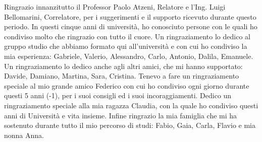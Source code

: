 Ringrazio innanzitutto il Professor Paolo Atzeni, Relatore e l'Ing. Luigi Bellomarini, Correlatore, per i suggerimenti e il supporto ricevuto durante questo periodo. \newline \newline
In questi cinque anni di università, ho conosciuto persone con le quali ho condiviso molto che ringrazio con tutto il cuore. \newline \newline
Un ringraziamento lo dedico al gruppo studio che abbiamo formato qui all'università e con cui ho condiviso la mia esperienza: Gabriele, Valerio, Alessandro, Carlo, Antonio, Dalila, Emanuele. \newline \newline
Un ringraziamento lo dedico anche agli altri amici, che mi hanno supportato: Davide, Damiano, Martina, Sara, Cristina. \newline \newline
Tenevo a fare un ringraziamento speciale al mio grande amico Federico con cui ho condiviso ogni giorno durante questi 5 anni (-1), per i suoi consigli ed i suoi incoraggiamenti. \newline \newline
Dedico un ringraziamento speciale alla mia ragazza Claudia, con la quale ho condiviso questi anni di Università e vita insieme.\newline \newline
Infine ringrazio la mia famiglia che mi ha sostenuto durante tutto il mio percorso di studi: Fabio, Gaia, Carla, Flavio e mia nonna Anna. \newline \newline